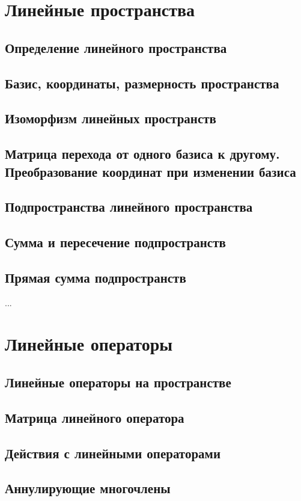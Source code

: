 \section{Линейные пространства}
\subsection{Определение линейного пространства}

\subsection{Базис, координаты, размерность пространства}
\subsection{Изоморфизм линейных пространств}
\subsection{Матрица перехода от одного базиса к другому. Преобразование координат при изменении базиса}
\subsection{Подпространства линейного пространства}
\subsection{Сумма и пересечение подпространств}
\subsection{Прямая сумма подпространств}
...
\section{Линейные операторы}
\subsection{Линейные операторы на пространстве}
\subsection{Матрица линейного оператора}
\subsection{Действия с линейными операторами}
\subsection{Аннулирующие многочлены}
